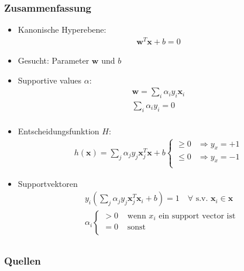 \begin{frame}
    \frametitle{Zusammenfassung}

    \begin{itemize}
        \item Kanonische Hyperebene:
            \begin{align*}
                \boldsymbol{w}^T \boldsymbol{x} + b = 0
            \end{align*}
        \item Gesucht: Parameter $\boldsymbol{w}$ und $b$
        \item Supportive values $\alpha$:
            \begin{align*}
                \boldsymbol{w} = \sum_i \alpha_i y_i \boldsymbol{x}_i \\
                \sum_i \alpha_i y_i = 0 \\
            \end{align*}
        \item Entscheidungsfunktion $H$:
            \begin{align*}
                h(\boldsymbol{x}) = \sum_j \alpha_j y_j \boldsymbol{x}_j^T \boldsymbol{x} + b \begin{cases}
                    \geq 0 & \Rightarrow y_x = +1 \\
                    \leq 0 & \Rightarrow y_x = -1 \\
                \end{cases}
            \end{align*}
        \item Supportvektoren
            \begin{align*}
                & y_i (\sum_j \alpha_j y_j \boldsymbol{x}_j^T \boldsymbol{x}_i + b) = 1 \quad \forall \text{ s.v. } \boldsymbol{x}_i \in \boldsymbol{x} \\
                & \alpha_i \begin{cases}
                    > 0 & \text{ wenn } x_i \text{ ein support vector ist} \\
                    = 0 & \text{ sonst} \\
                \end{cases} \\
            \end{align*}
    \end{itemize}
\end{frame}

\begin{frame}
    \frametitle{Quellen}

    \nocite{*}
    \printbibliography
\end{frame}
